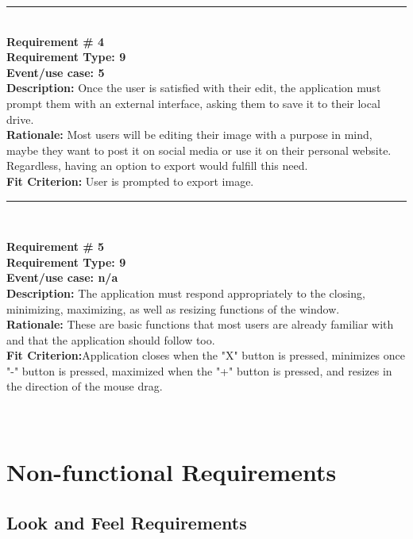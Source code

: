 \documentclass[12pt, titlepage]{article}
\begin{document}
	\noindent\rule{12cm}{0.4pt} \\

	\noindent\textbf{Requirement \# 4}\\
	\textbf{Requirement Type: 9}\\
	\textbf{Event/use case: 5}\\
	\textbf{Description:} Once the user is satisfied with their edit, the application must prompt them with an external interface, asking them to save it to their local drive. \\
	\textbf{Rationale:}  Most users will be editing their image with a purpose in mind, maybe they want to post it on social media or use it on their personal website. Regardless, having an option to export would fulfill this need.\\
	\textbf{Fit Criterion:} User is prompted to export image.\\

	\noindent\rule{12cm}{0.4pt} \\
	
	\newpage

	\noindent\textbf{Requirement \# 5}\\
	\textbf{Requirement Type: 9}\\
	\textbf{Event/use case: n/a}\\
	\textbf{Description:} The application must respond appropriately to the closing, minimizing, maximizing, as well as resizing functions of the window.\\
	\textbf{Rationale:} These are basic functions that most users are already familiar with and that the application should follow too.\\
	\textbf{Fit Criterion:}Application closes when the "X" button is pressed, minimizes once "-" button is pressed, maximized when the "+" button is pressed, and resizes in the direction of the mouse drag.\\ \\ \\

\newpage

\section{Non-functional Requirements}

\subsection{Look and Feel Requirements}
\end{document}
